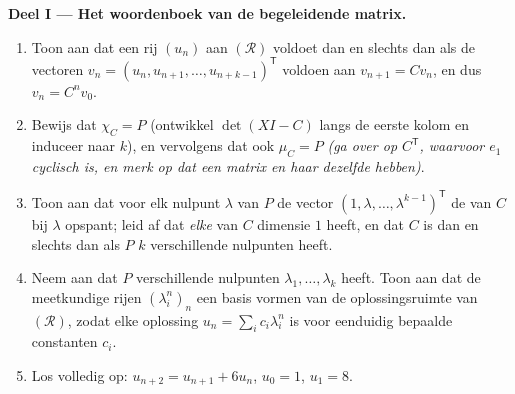 \begin{problem}
\medskip
\noindent\textbf{Deel I --- Het woordenboek van de begeleidende
matrix.}
\begin{enumerate}
  \item Toon aan dat een rij $(u_n)$ aan $(\mathcal R)$ voldoet dan
        en slechts dan als de vectoren $v_n = (u_n, u_{n+1}, \dots,
        u_{n+k-1})^{\mathsf T}$ voldoen aan $v_{n+1} = Cv_n$, en
        dus $v_n = C^n v_0$.
  \item Bewijs dat $\chi_C = P$ (ontwikkel $\det(XI - C)$ langs de
        eerste kolom en induceer naar $k$), en vervolgens dat ook
        $\mu_C = P$ \emph{(ga over op $C^{\mathsf T}$, waarvoor
        $e_1$ cyclisch is, en merk op dat een matrix en haar
         dezelfde  hebben)}.
  \item Toon aan dat voor elk nulpunt $\lambda$ van $P$ de vector
        $(1, \lambda, \dots, \lambda^{k-1})^{\mathsf T}$ de
         van $C$ bij $\lambda$ opspant; leid af dat
        \emph{elke}  van $C$ dimensie $1$ heeft, en dat
        $C$  is dan en slechts dan als $P$ $k$
        verschillende nulpunten heeft.
  \item Neem aan dat $P$ verschillende nulpunten $\lambda_1, \dots,
        \lambda_k$ heeft. Toon aan dat de meetkundige rijen
        $(\lambda_i^n)_n$ een basis vormen van de oplossingsruimte
        van $(\mathcal R)$, zodat elke oplossing $u_n = \sum_i
        c_i\lambda_i^n$ is voor eenduidig bepaalde constanten
        $c_i$.
  \item Los volledig op: $u_{n+2} = u_{n+1} + 6u_n$, $u_0 = 1$,
        $u_1 = 8$.
\end{enumerate}


\end{problem}

